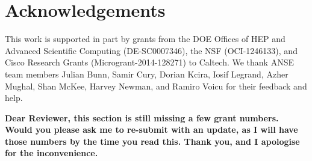 \section{Acknowledgements}

This work is supported in part by grants from the DOE Offices of HEP and Advanced Scientific Computing (DE-SC0007346), the NSF (OCI-1246133), and Cisco Research Grants (Microgrant-2014-128271) to Caltech. We thank ANSE team members Julian Bunn, Samir Cury, Dorian Kcira, Iosif Legrand, Azher Mughal, Shan McKee, Harvey Newman, and Ramiro Voicu for their feedback and help.

{\bf Dear Reviewer, this section is still missing a few grant numbers. Would you please ask me to re-submit with an update, as I will have those numbers by the time you read this. Thank you, and I apologise for the inconvenience.}